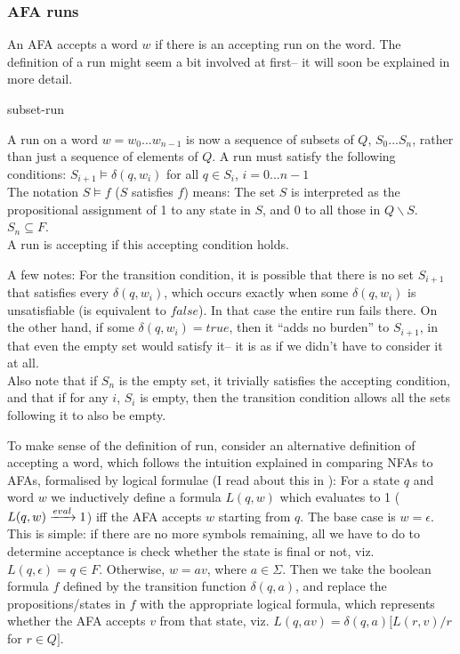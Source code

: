 \subsubsection{AFA runs}
An AFA accepts a word $w$ if there is an accepting run on the word. The definition of a run might seem a bit involved at first-- it will soon be explained in more detail.

\begin{defnL}{subset-run}

    A run on a word $w=w_0...w_{n-1}$ is now a sequence of subsets of $Q$,  $S_0...S_n$, rather than just a sequence of elements of $Q$. A run must satisfy the following conditions:
           {$S_{i+1} \models \delta(q, w_i)$ for all $q \in S_i$, $i=0...n-1$ \\ The notation $S \models f$ ($S$ satisfies $f$) means: The set $S$ is interpreted as the propositional assignment of 1 to any state in $S$, and 0 to all those in $Q \backslash S$.}
           {$S_n \subseteq F$. \\ A run is accepting if this accepting condition holds.}
\end{defnL}

A few notes: For the transition condition, it is possible that there is no set $S_{i+1}$ that satisfies every $\delta(q,w_i)$, which occurs exactly when some $\delta(q,w_i)$ is unsatisfiable (is equivalent to $false$). In that case the entire run fails there. On the other hand, if some $\delta(q,w_i) = true$, then it ``adds no burden'' to $S_{i+1}$, in that even the empty set would satisfy it-- it is as if we didn't have to consider it at all. \\ Also note that if $S_n$ is the empty set, it trivially satisfies the accepting condition, and that if for any $i$, $S_i$ is empty, then the transition condition allows all the sets following it to also be empty.

To make sense of the definition of run, consider an alternative definition of accepting a word, which follows the intuition explained in comparing NFAs to AFAs, formalised by logical formulae (I read about this in \cite{kumar}): For a state $q$ and word $w$ we inductively define a formula $L(q,w)$ which evaluates to 1 ($L(q,w) \xrightarrow{eval} 1$) iff the AFA accepts $w$ starting from $q$. The base case is $w=\epsilon$. This is simple: if there are no more symbols remaining, all we have to do to determine acceptance is check whether the state is final or not, viz. $L(q,\epsilon) = q \in F$.
Otherwise, $w=av$, where $a \in \Sigma$. Then we take the boolean formula $f$ defined by the transition function $\delta(q, a)$, and replace the propositions/states in $f$ with the appropriate logical formula, which represents whether the AFA accepts $v$ from that state, viz. $L(q,av) = \delta(q, a)[L(r,v) / r$ for $r \in Q]$.

